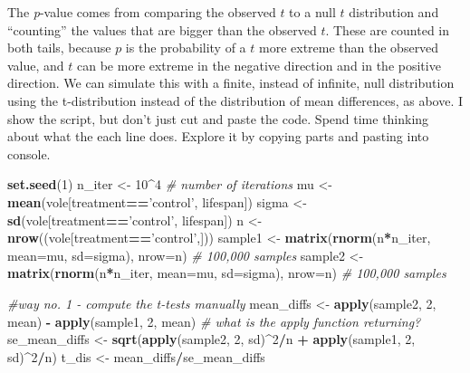 \documentclass[]{book}
\newenvironment{Shaded}{\begin{snugshade}}{\end{snugshade}}
\newcommand{\CommentTok}[1]{\textcolor[rgb]{0.56,0.35,0.01}{\textit{#1}}}
\newcommand{\DataTypeTok}[1]{\textcolor[rgb]{0.13,0.29,0.53}{#1}}
\newcommand{\DecValTok}[1]{\textcolor[rgb]{0.00,0.00,0.81}{#1}}
\newcommand{\KeywordTok}[1]{\textcolor[rgb]{0.13,0.29,0.53}{\textbf{#1}}}
\newcommand{\NormalTok}[1]{#1}
\newcommand{\OperatorTok}[1]{\textcolor[rgb]{0.81,0.36,0.00}{\textbf{#1}}}
\newcommand{\StringTok}[1]{\textcolor[rgb]{0.31,0.60,0.02}{#1}}
\begin{document}
The \emph{p}-value comes from comparing the observed \(t\) to a null \(t\) distribution and ``counting'' the values that are bigger than the observed \(t\). These are counted in both tails, because \(p\) is the probability of a \(t\) more extreme than the observed value, and \(t\) can be more extreme in the negative direction and in the positive direction. We can simulate this with a finite, instead of infinite, null distribution using the t-distribution instead of the distribution of mean differences, as above. I show the script, but don't just cut and paste the code. Spend time thinking about what the each line does. Explore it by copying parts and pasting into console.

\begin{Shaded}
\begin{Highlighting}[]
\KeywordTok{set.seed}\NormalTok{(}\DecValTok{1}\NormalTok{)}
\NormalTok{n_iter <-}\StringTok{ }\DecValTok{10}\OperatorTok{^}\DecValTok{4} \CommentTok{# number of iterations}
\NormalTok{mu <-}\StringTok{ }\KeywordTok{mean}\NormalTok{(vole[treatment}\OperatorTok{==}\StringTok{'control'}\NormalTok{, lifespan]) }
\NormalTok{sigma <-}\StringTok{ }\KeywordTok{sd}\NormalTok{(vole[treatment}\OperatorTok{==}\StringTok{'control'}\NormalTok{, lifespan])}
\NormalTok{n <-}\StringTok{ }\KeywordTok{nrow}\NormalTok{((vole[treatment}\OperatorTok{==}\StringTok{'control'}\NormalTok{,]))}
\NormalTok{sample1 <-}\StringTok{ }\KeywordTok{matrix}\NormalTok{(}\KeywordTok{rnorm}\NormalTok{(n}\OperatorTok{*}\NormalTok{n_iter, }\DataTypeTok{mean=}\NormalTok{mu, }\DataTypeTok{sd=}\NormalTok{sigma), }\DataTypeTok{nrow=}\NormalTok{n) }\CommentTok{# 100,000 samples}
\NormalTok{sample2 <-}\StringTok{ }\KeywordTok{matrix}\NormalTok{(}\KeywordTok{rnorm}\NormalTok{(n}\OperatorTok{*}\NormalTok{n_iter, }\DataTypeTok{mean=}\NormalTok{mu, }\DataTypeTok{sd=}\NormalTok{sigma), }\DataTypeTok{nrow=}\NormalTok{n) }\CommentTok{# 100,000 samples}

\CommentTok{#way no. 1 - compute the t-tests manually}
\NormalTok{mean_diffs <-}\StringTok{ }\KeywordTok{apply}\NormalTok{(sample2, }\DecValTok{2}\NormalTok{, mean) }\OperatorTok{-}\StringTok{ }\KeywordTok{apply}\NormalTok{(sample1, }\DecValTok{2}\NormalTok{, mean) }\CommentTok{# what is the apply function returning?}
\NormalTok{se_mean_diffs <-}\StringTok{ }\KeywordTok{sqrt}\NormalTok{(}\KeywordTok{apply}\NormalTok{(sample2, }\DecValTok{2}\NormalTok{, sd)}\OperatorTok{^}\DecValTok{2}\OperatorTok{/}\NormalTok{n }\OperatorTok{+}\StringTok{ }\KeywordTok{apply}\NormalTok{(sample1, }\DecValTok{2}\NormalTok{, sd)}\OperatorTok{^}\DecValTok{2}\OperatorTok{/}\NormalTok{n)}
\NormalTok{t_dis <-}\StringTok{ }\NormalTok{mean_diffs}\OperatorTok{/}\NormalTok{se_mean_diffs}


\end{Highlighting}
\end{Shaded}
\end{document}
